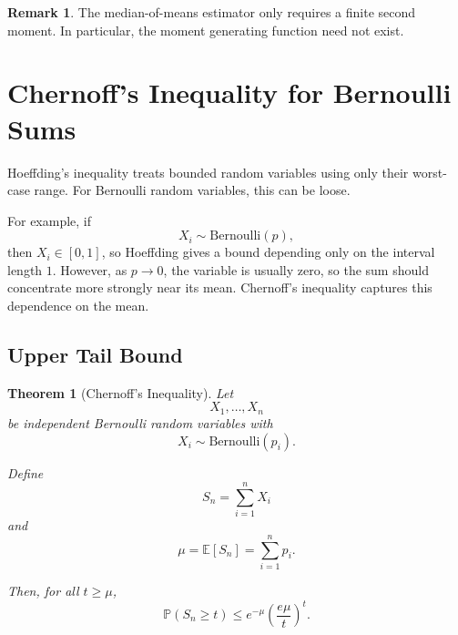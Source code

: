 \documentclass[12pt,oneside]{book}
\numberwithin{equation}{section}
\theoremstyle{definition}
\newtheorem{remark}{Remark}[section]
\theoremstyle{plain}
\newtheorem{theorem}{Theorem}[section]
\theoremstyle{remark}
\newcommand{\E}{\mathbb{E}}
\newcommand{\Prob}{\mathbb{P}}
\newcommand{\Bern}{\mathrm{Bernoulli}}
\begin{document}
\begin{remark}
The median-of-means estimator only requires a finite second moment. In particular, the moment generating function need not exist.
\end{remark}

\section{Chernoff's Inequality for Bernoulli Sums}

Hoeffding's inequality treats bounded random variables using only their worst-case range. For Bernoulli random variables, this can be loose.

For example, if
\[
X_i\sim \Bern(p),
\]
then $X_i\in[0,1]$, so Hoeffding gives a bound depending only on the interval length $1$. However, as $p\to 0$, the variable is usually zero, so the sum should concentrate more strongly near its mean. Chernoff's inequality captures this dependence on the mean.

\subsection{Upper Tail Bound}

\begin{theorem}[Chernoff's Inequality]
Let
\[
X_1,\dots,X_n
\]
be independent Bernoulli random variables with
\[
X_i\sim \Bern(p_i).
\]

Define
\[
S_n=\sum_{i=1}^n X_i
\]
and
\[
\mu=\E[S_n]=\sum_{i=1}^n p_i.
\]

Then, for all $t\geq \mu$,
\[
\Prob(S_n\geq t)
\leq
e^{-\mu}
\left(
\frac{e\mu}{t}
\right)^t.
\]
\end{theorem}
\end{document}
